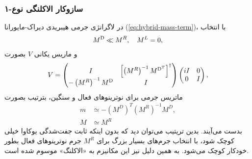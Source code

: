 \documentclass[a4paper]{book}
\begin{document}
\subsubsection{سازوکار الاکلنگی نوع-۱}
\label{sec:seesaw}
در لاگرانژی جرمی هیبریدی دیراک-مایورانا (\ref{eq:hybrid-mass-term})، با انتخاب
{\footnotesize\begin{align}
		M^{\rm D} \ll M^R, \quad M^L=0,
\end{align}}
و ماریس یکانی {\footnotesize$V$} بصورت
{\footnotesize\begin{align}
	V=\begin{pmatrix}
		I&\left[\left(M^{R}\right)^{-1} M^{{\rm D}^T}\right]^{\dagger}\\
		-\left(M^{R}\right)^{-1} M^{\rm D}&I
	\end{pmatrix}
	\begin{pmatrix}
		iI&0\\
		0&I
	\end{pmatrix},
\end{align}}
ماتریس جرمی برای نوترینوهای فعال و سنگین، بترتیب بصورت
{\footnotesize\begin{align}
	m&\simeq -\left(M^D\right)^T \left(M^R\right)^{-1} M^D ,\\
	M&\simeq M^R
\end{align}}
بدست می‌آیند.
بدین تریتیب می‌توان دید که بدون اینکه ثابت جفت‌شدگی یوکاوا خیلی کوچک شود، با انتخاب جرم‌های بسیار بزرگ برای {\footnotesize$M^R$} جرم نوترینوهای فعال بطور خودکار کوچک می‌شود. به همین دلیل نیز این مکانیزم به «الاکلنگ» موسوم شده است.
\end{document}

